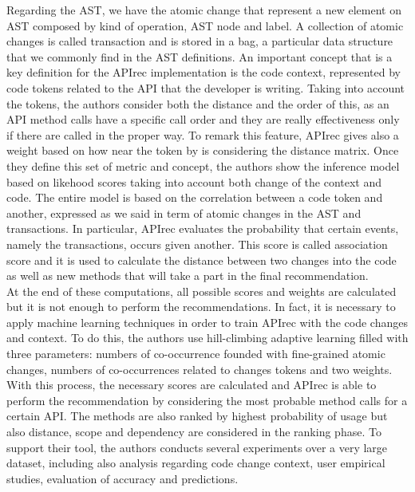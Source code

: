 Regarding the AST, we have the atomic change that represent a new element on 
AST composed by kind of operation, AST node and label. A collection of atomic 
changes is called transaction and is stored in a bag, a particular data 
structure that we commonly find in the AST definitions. An important concept 
that is a key definition for the APIrec implementation is the code context, 
represented by code tokens related to the API that the developer is writing. 
Taking into account the tokens, the authors consider both the distance and the 
order of this, as an API method calls have a specific call order and they are 
really effectiveness only if there are called in the proper way. To remark this 
feature, APIrec gives also a weight based on how near the token by is 
considering the distance matrix. Once they define this set of metric and 
concept, the authors show the inference model based on likehood scores taking 
into account both change of the context and code.\newline
The entire model is based on the correlation between a code token and another, expressed as we said in term of atomic changes in the AST and transactions. In particular, APIrec evaluates the probability that certain events, namely the transactions, occurs given another. This score is called association score and it is used to calculate the distance between two changes into the code as well as new methods that will take a part in the final recommendation. \\
At the end of these computations, all possible scores and weights are calculated but it is not enough to perform the recommendations. In fact, it is necessary to apply machine learning techniques in order to train APIrec with the code changes and context. To do this, the authors use hill-climbing adaptive learning filled with three parameters: numbers of co-occurrence founded with fine-grained atomic changes, numbers of co-occurrences related to changes tokens and two weights. With this process, the necessary scores are calculated and APIrec is able to perform the recommendation by considering the most probable method calls for a certain API. The methods are also ranked by highest probability of usage but also distance, scope and dependency are considered in the ranking phase. To support their tool, the authors conducts several experiments over a very large dataset, including also analysis regarding code change context, user empirical studies, evaluation of accuracy and predictions.



